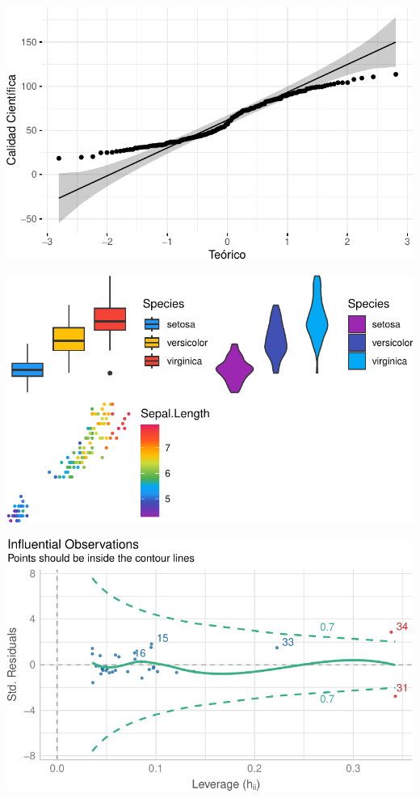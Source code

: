 \documentclass[
]{article}
\begin{document}
\includegraphics{template_files/figure-pdf/unnamed-chunk-7-1.pdf}

\includegraphics{template_files/figure-pdf/unnamed-chunk-8-1.pdf}

\includegraphics{template_files/figure-pdf/unnamed-chunk-9-1.pdf}
\end{document}
